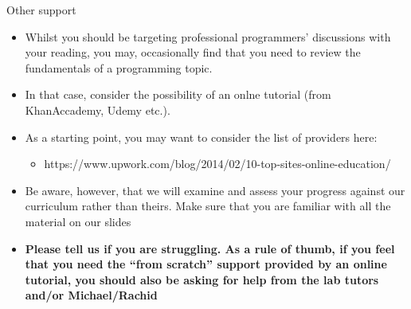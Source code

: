 \documentclass{beamer}
\begin{document}
\begin{frame}
Other support
\begin{itemize}
\item Whilst you should be targeting professional programmers' discussions with your reading, you may, occasionally find that you need to review the fundamentals of a programming topic.
\item In that case, consider the possibility of an onlne tutorial (from KhanAccademy, Udemy etc.).
\item As a starting point, you may want to consider the list of providers here:
\begin{itemize}
\item https://www.upwork.com/blog/2014/02/10-top-sites-online-education/
\end{itemize}
\item Be aware, however, that we will examine and assess your progress against our curriculum rather than theirs. Make sure that you are familiar with all the material on our slides 
\item \textbf{Please tell us if you are struggling. As a rule of thumb, if you feel that you need the ``from scratch'' support provided by an online tutorial, you should also be asking for help from the lab tutors and/or Michael/Rachid}
\end{itemize}
\end{frame}
\end{document}
